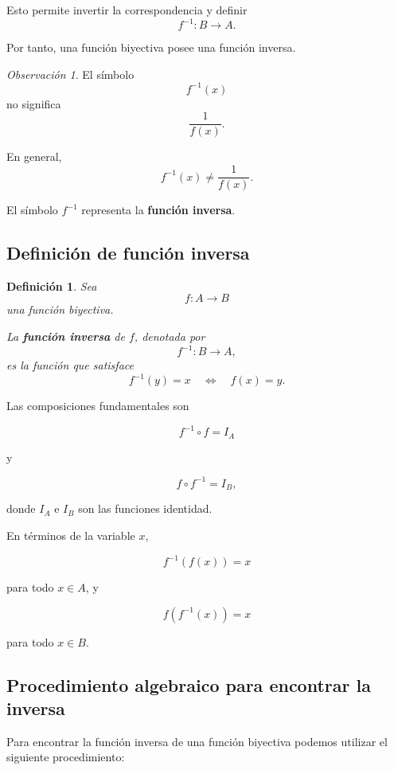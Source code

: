 \documentclass[12pt]{article}
\newtheorem{definicion}{Definición}[section]
\theoremstyle{remark}
\newtheorem{observacion}{Observación}[section]
\begin{document}
Esto permite invertir la correspondencia y definir
\[
f^{-1}:B\longrightarrow A.
\]

Por tanto, una función biyectiva posee una función inversa.

\begin{observacion}
El símbolo
\[
f^{-1}(x)
\]
no significa
\[
\frac{1}{f(x)}.
\]

En general,
\[
\boxed{
f^{-1}(x)\neq\frac{1}{f(x)}.
}
\]

El símbolo \(f^{-1}\) representa la \textbf{función inversa}.
\end{observacion}

\subsection{Definición de función inversa}

\begin{definicion}
Sea
\[
f:A\longrightarrow B
\]
una función biyectiva.

La \textbf{función inversa} de \(f\), denotada por
\[
f^{-1}:B\longrightarrow A,
\]
es la función que satisface
\[
f^{-1}(y)=x
\quad\Longleftrightarrow\quad
f(x)=y.
\]
\end{definicion}

Las composiciones fundamentales son

\[
\boxed{
f^{-1}\circ f=I_A
}
\]

y

\[
\boxed{
f\circ f^{-1}=I_B,
}
\]

donde \(I_A\) e \(I_B\) son las funciones identidad.

En términos de la variable \(x\),

\[
\boxed{
f^{-1}(f(x))=x
}
\]

para todo \(x\in A\), y

\[
\boxed{
f(f^{-1}(x))=x
}
\]

para todo \(x\in B\).

\subsection{Procedimiento algebraico para encontrar la inversa}

Para encontrar la función inversa de una función biyectiva podemos
utilizar el siguiente procedimiento:
\end{document}
